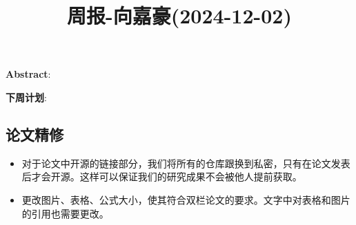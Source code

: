 \documentclass[11pt,a4paper]{article}
\title{周报-向嘉豪(2024-12-02)}
\renewcommand{\maketitle}{
  \begin{center}
    \LARGE\bfseries\thetitle
  \end{center}
}
\begin{document}
\maketitle


\noindent \textbf{Abstract}: 

\noindent \textbf{下周计划}: 

\subsection{论文精修}

\begin{itemize}
  \item 对于论文中开源的链接部分，我们将所有的仓库跟换到私密，只有在论文发表后才会开源。这样可以保证我们的研究成果不会被他人提前获取。
  \item 更改图片、表格、公式大小，使其符合双栏论文的要求。文字中对表格和图片的引用也需要更改。
\end{itemize}






% 
% 
\end{document}
